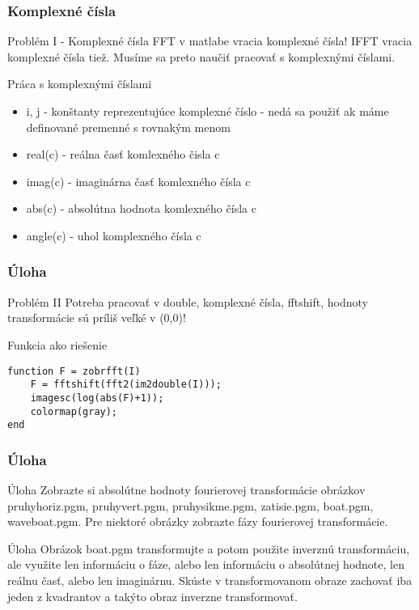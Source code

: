 \documentclass{beamer}
\begin{document}
\begin{frame}
\frametitle{Komplexné čísla}
  
  \begin{alertblock}{Problém I - Komplexné čísla}
    FFT v matlabe vracia komplexné čísla! IFFT vracia komplexné čísla tiež. Musíme sa preto naučiť pracovať s komplexnými číslami.
  \end{alertblock}
  
  \begin{block}{Práca s komplexnými číslami}
  \begin{itemize}
  \item i, j - konštanty reprezentujúce komplexné číslo - nedá sa použiť ak máme definované premenné s rovnakým menom
  \item real(c) - reálna časť komlexného čisla c
  \item imag(c) - imaginárna časť komlexného čísla c
  \item abs(c) - absolútna hodnota komlexného čísla c
  \item angle(c) - uhol komplexného čísla c
  \end{itemize}
  \end{block}
\end{frame}

\begin{frame}[fragile]
\frametitle{Úloha} 

  \begin{alertblock}{Problém II}
    Potreba pracovať v double, komplexné čísla, fftshift, hodnoty transformácie sú príliš veľké v (0,0)!
  \end{alertblock}

  \begin{block}{Funkcia ako riešenie}
  \begin{verbatim}
function F = zobrfft(I)
    F = fftshift(fft2(im2double(I)));
    imagesc(log(abs(F)+1));
    colormap(gray);
end \end{verbatim}
  \end{block}    
    
\end{frame}

\begin{frame}[fragile]
\frametitle{Úloha} 

  \begin{block}{Úloha}
    Zobrazte si absolútne hodnoty fourierovej transformácie obrázkov pruhyhoriz.pgm, pruhyvert.pgm, pruhysikme.pgm, zatisie.pgm, boat.pgm, waveboat.pgm. Pre niektoré obrázky zobrazte fázy fourierovej transformácie.
  \end{block}
  
    \begin{block}{Úloha}
    Obrázok boat.pgm transformujte a potom použite inverznú transformáciu, ale využite len informáciu o fáze, alebo len informáciu o absolútnej hodnote, len reálnu časť, alebo len imaginárnu. Skúste v transformovanom obraze zachovať iba jeden z kvadrantov a takýto obraz inverzne transformovať.
  \end{block}  
\end{frame}
\end{document}
